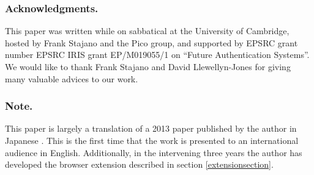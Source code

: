 \documentclass[runningheads,a4paper]{llncs}
\begin{document}

\subsubsection*{Acknowledgments.}

This paper was written while on
sabbatical at the University of Cambridge, hosted by Frank Stajano and
the Pico group, and supported by EPSRC grant number
EPSRC IRIS grant EP/M019055/1 on  ``Future Authentication Systems''.
%
We would like to thank Frank Stajano and David Llewellyn-Jones for
giving many valuable advices to our work.

\subsubsection*{Note.}

This paper is largely a translation of a 2013 paper published by the
author in Japanese \cite{WISS2013}. This is the first time that the
work is presented to an international audience in English.
Additionally, in the intervening three years the author has
developed the browser extension described in section \ref{extensionsection}.



\end{document}
